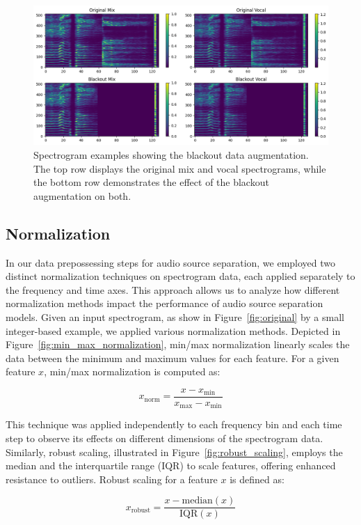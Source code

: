 \documentclass[conference]{IEEEtran}
\begin{document}
\begin{figure}[!htb]
\centering
\includegraphics[width=0.9\linewidth]{blackout_aug.png}
\caption{Spectrogram examples showing the blackout data augmentation. The top row displays the original mix and vocal spectrograms, while the bottom row demonstrates the effect of the blackout augmentation on both.}
\label{fig:blackout}
\end{figure}


\subsection{Normalization}

In our data prepossessing steps for audio source separation, we employed two distinct normalization techniques on spectrogram data, each applied separately to the frequency and time axes. This approach allows us to analyze how different normalization methods impact the performance of audio source separation models. Given an input spectrogram, as show in Figure~\ref{fig:original} by a small integer-based example, we applied various normalization methods. Depicted in Figure~\ref{fig:min_max_normalization}, min/max normalization linearly scales the data between the minimum and maximum values for each feature. For a given feature \( x \), min/max normalization is computed as:

\[ x_{\text{norm}} = \frac{x - x_{\text{min}}}{x_{\text{max}} - x_{\text{min}}} \]

This technique was applied independently to each frequency bin and each time step to observe its effects on different dimensions of the spectrogram data. Similarly, robust scaling, illustrated in Figure~\ref{fig:robust_scaling}, employs the median and the interquartile range (IQR) to scale features, offering enhanced resistance to outliers. Robust scaling for a feature \( x \) is defined as:

\[ x_{\text{robust}} = \frac{x - \text{median}(x)}{\text{IQR}(x)} \]
\end{document}
